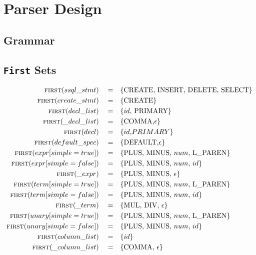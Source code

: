 \documentclass{article}
\begin{document}
\section{Parser Design}

\subsection{Grammar}

\subsection{\texttt{First} Sets}
\begin{align*}
\textsc{first}(ssql\_stmt) \quad =& \quad\{\text{CREATE, INSERT, DELETE, SELECT}\} \\
\textsc{first}(create\_stmt) \quad =& \quad\{\text{CREATE}\} \\
\textsc{first}(decl\_list) \quad =& \quad\{id\text{, PRIMARY}\} \\
\textsc{first}(\_decl\_list) \quad =& \quad\{\text{COMMA,} \epsilon\} \\
\textsc{first}(decl) \quad =& \quad\{{id\text, PRIMARY}\} \\
\textsc{first}(default\_spec) \quad =& \quad\{\text{DEFAULT,} \epsilon\} \\
\textsc{first}(expr[simple=true]) \quad =& \quad\{\text{PLUS, MINUS, } num \text{, L\_PAREN}\} \\
\textsc{first}(expr[simple=false]) \quad =& \quad\{\text{PLUS, MINUS, }num\text{, }id\} \\
\textsc{first}(\_expr) \quad =& \quad\{\text{PLUS, MINUS, }\epsilon\} \\
\textsc{first}(term[simple=true]) \quad =& \quad\{\text{PLUS, MINUS, }num\text{, L\_PAREN}\} \\
\textsc{first}(term[simple=false]) \quad =& \quad\{\text{PLUS, MINUS, }num\text{, }id\} \\
\textsc{first}(\_term) \quad =& \quad\{\text{MUL, DIV, }\epsilon\} \\
\textsc{first}(unary[simple=true]) \quad =& \quad\{\text{PLUS, MINUS, } num \text{, L\_PAREN}\} \\
\textsc{first}(unary[simple=false]) \quad =& \quad\{\text{PLUS, MINUS, }num\text{, }id\} \\
\textsc{first}(column\_list) \quad =& \quad\{id\} \\
\textsc{first}(\_column\_list) \quad =& \quad\{\text{COMMA, }\epsilon\} \\

\end{align*}
\end{document}
